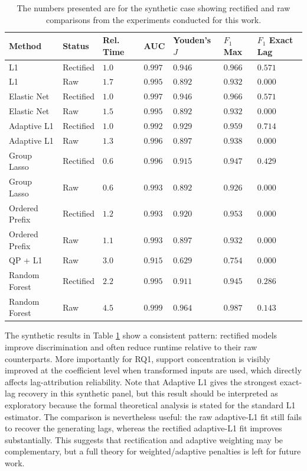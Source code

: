 \begin{table}[tbh]
    \caption[Synthetic data case study results.]{The numbers presented are for the synthetic case showing rectified and raw comparisons from the experiments conducted for this work.}
    \label{tab:synth_results}
    \begin{center}
        \begin{tabular}{lllllll}
            Method & Status & Rel. Time & AUC & Youden's $J$ & $F_1$ Max & $F_1$ Exact Lag \\ \hline
            L1 & Rectified & $1.0$ & $0.997$ & $0.946$ & $0.966$ & $0.571$ \\ \hline
            L1 & Raw & $1.7$ & $0.995$ & $0.892$ & $0.932$ & $0.000$ \\ \hline
            Elastic Net & Rectified & $1.0$ & $0.997$ & $0.946$ & $0.966$ & $0.571$ \\ \hline
            Elastic Net & Raw & $1.5$ & $0.995$ & $0.892$ & $0.932$ & $0.000$ \\ \hline
            Adaptive L1 & Rectified & $1.0$ & $0.992$ & $0.929$ & $0.959$ & $0.714$ \\ \hline
            Adaptive L1 & Raw & $1.3$ & $0.996$ & $0.897$ & $0.938$ & $0.000$ \\ \hline
            Group Lasso & Rectified & $0.6$ & $0.996$ & $0.915$ & $0.947$ & $0.429$ \\ \hline
            Group Lasso & Raw & $0.6$ & $0.993$ & $0.892$ & $0.926$ & $0.000$ \\ \hline
            Ordered Prefix & Rectified & $1.2$ & $0.993$ & $0.920$ & $0.953$ & $0.000$ \\ \hline
            Ordered Prefix & Raw & $1.1$ & $0.993$ & $0.897$ & $0.932$ & $0.000$ \\ \hline
            QP + L1 & Raw & $3.0$ & $0.915$ & $0.629$ & $0.754$ & $0.000$ \\ \hline
            Random Forest & Rectified & $2.2$ & $0.995$ & $0.911$ & $0.945$ & $0.286$ \\ \hline
            Random Forest & Raw & $4.5$ & $0.999$ & $0.964$ & $0.987$ & $0.143$ \\ \hline
        \end{tabular}
    \end{center}
\end{table}

The synthetic results in Table \ref{tab:synth_results} show a consistent pattern: rectified models improve discrimination and often reduce runtime relative to their raw counterparts. More importantly for RQ1, support concentration is visibly improved at the coefficient level when transformed inputs are used, which directly affects lag-attribution reliability. Note that Adaptive L1 gives the strongest exact-lag recovery in this synthetic panel, but this result should be interpreted as exploratory because the formal theoretical analysis is stated for the standard L1 estimator. The comparison is nevertheless useful: the raw adaptive-L1 fit still fails to recover the generating lags, whereas the rectified adaptive-L1 fit improves substantially. This suggests that rectification and adaptive weighting may be complementary, but a full theory for weighted/adaptive penalties is left for future work.

